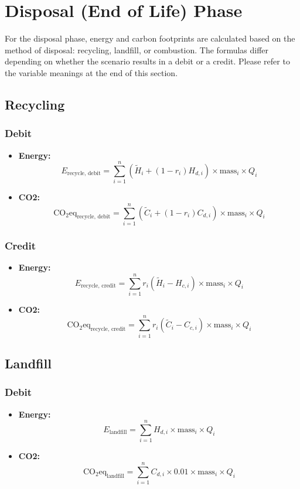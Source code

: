 \documentclass[a4paper, twocolumn]{article}
\begin{document}
\section*{Disposal (End of Life) Phase}

For the disposal phase, energy and carbon footprints are calculated based on the method of disposal: recycling, landfill, or combustion. The formulas differ depending on whether the scenario results in a debit or a credit. Please refer to the variable meanings at the end of this section.

\subsection*{Recycling}

\subsubsection*{Debit}
\begin{itemize}
    \item \textbf{Energy:} 
    \[
    E_{\text{recycle, debit}} = \sum_{i=1}^{n} \left( \tilde{H}_i + (1 - r_i) H_{d,i} \right) \times \text{mass}_i \times Q_i
    \]
    \item \textbf{CO2:} 
    \[
    \text{CO}_2\text{eq}_{\text{recycle, debit}} = \sum_{i=1}^{n} \left( \tilde{C}_i + (1 - r_i) C_{d,i} \right) \times \text{mass}_i \times Q_i
    \]
\end{itemize}

\subsubsection*{Credit}
\begin{itemize}
    \item \textbf{Energy:} 
    \[
    E_{\text{recycle, credit}} = \sum_{i=1}^{n} r_i \left( \tilde{H}_i - H_{c,i} \right) \times \text{mass}_i \times Q_i
    \]
    \item \textbf{CO2:} 
    \[
    \text{CO}_2\text{eq}_{\text{recycle, credit}} = \sum_{i=1}^{n} r_i \left( \tilde{C}_i - C_{c,i} \right) \times \text{mass}_i \times Q_i
    \]
\end{itemize}

\subsection*{Landfill}

\subsubsection*{Debit}
\begin{itemize}
    \item \textbf{Energy:} 
    \[
    E_{\text{landfill}} = \sum_{i=1}^{n} H_{d,i} \times \text{mass}_i \times Q_i
    \]
    \item \textbf{CO2:} 
    \[
    \text{CO}_2\text{eq}_{\text{landfill}} = \sum_{i=1}^{n} C_{d,i} \times 0.01 \times \text{mass}_i \times Q_i
    \]
\end{itemize}
\end{document}
